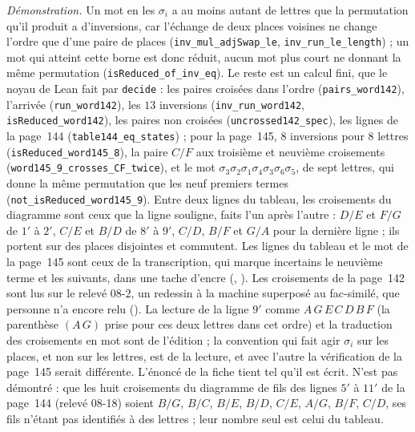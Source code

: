 {\small \emph{Démonstration.} Un mot en les $\sigma_i$ a au moins autant de lettres que la permutation qu'il produit a d'inversions, car l'échange de deux places voisines ne change l'ordre que d'une paire de places (\texttt{inv\_mul\_adjSwap\_le}, \texttt{inv\_run\_le\_length}) ; un mot qui atteint cette borne est donc réduit, aucun mot plus court ne donnant la même permutation (\texttt{isReduced\_of\_inv\_eq}). Le reste est un calcul fini, que le noyau de Lean fait par \texttt{decide} : les paires croisées dans l'ordre (\texttt{pairs\_word142}), l'arrivée (\texttt{run\_word142}), les $13$ inversions (\texttt{inv\_run\_word142}, \texttt{isReduced\_word142}), les paires non croisées (\texttt{uncrossed142\_spec}), les lignes de la page~144 (\texttt{table144\_eq\_states}) ; pour la page~145, $8$ inversions pour $8$ lettres (\texttt{isReduced\_word145\_8}), la paire $C/F$ aux troisième et neuvième croisements (\texttt{word145\_9\_crosses\_CF\_twice}), et le mot $\sigma_3\sigma_2\sigma_1\sigma_4\sigma_3\sigma_6\sigma_5$, de sept lettres, qui donne la même permutation que les neuf premiers termes (\texttt{not\_isReduced\_word145\_9}). Entre deux lignes du tableau, les croisements du diagramme sont ceux que la ligne souligne, faits l'un après l'autre : $D/E$ et $F/G$ de $1'$ à $2'$, $C/E$ et $B/D$ de $8'$ à $9'$, $C/D$, $B/F$ et $G/A$ pour la dernière ligne ; ils portent sur des places disjointes et commutent. Les lignes du tableau et le mot de la page~145 sont ceux de la transcription, qui marque incertains le neuvième terme et les suivants, dans une tache d'encre (, ). Les croisements de la page~142 sont lus sur le relevé 08-2, un redessin à la machine superposé au fac-similé, que personne n'a encore relu (). La lecture de la ligne $9'$ comme $A\,G\,E\,C\,D\,B\,F$ (la parenthèse $(A\,G)$ prise pour ces deux lettres dans cet ordre) et la traduction des croisements en mot sont de l'édition ; la convention qui fait agir $\sigma_i$ sur les places, et non sur les lettres, est de la lecture, et avec l'autre la vérification de la page~145 serait différente. L'énoncé de la fiche tient tel qu'il est écrit. N'est pas démontré : que les huit croisements du diagramme de fils des lignes $5'$ à $11'$ de la page~144 (relevé 08-18) soient $B/G$, $B/C$, $B/E$, $B/D$, $C/E$, $A/G$, $B/F$, $C/D$, ses fils n'étant pas identifiés à des lettres ; leur nombre seul est celui du tableau.\par}

